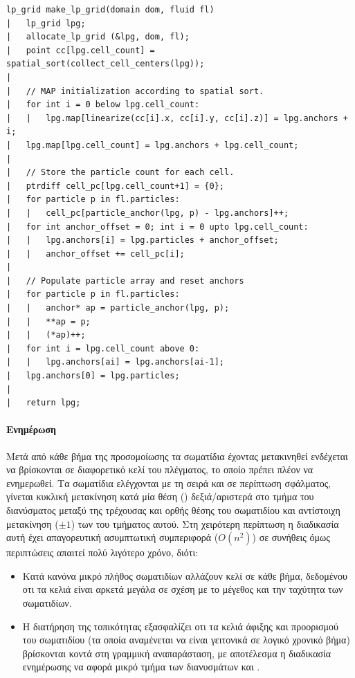 \begin{verbatim}
lp_grid make_lp_grid(domain dom, fluid fl)
|   lp_grid lpg;
|   allocate_lp_grid (&lpg, dom, fl);
|   point cc[lpg.cell_count] = spatial_sort(collect_cell_centers(lpg));
|
|   // MAP initialization according to spatial sort.
|   for int i = 0 below lpg.cell_count:
|   |   lpg.map[linearize(cc[i].x, cc[i].y, cc[i].z)] = lpg.anchors + i;
|   lpg.map[lpg.cell_count] = lpg.anchors + lpg.cell_count;
|
|   // Store the particle count for each cell.
|   ptrdiff cell_pc[lpg.cell_count+1] = {0};
|   for particle p in fl.particles:
|   |   cell_pc[particle_anchor(lpg, p) - lpg.anchors]++;
|   for int anchor_offset = 0; int i = 0 upto lpg.cell_count:
|   |   lpg.anchors[i] = lpg.particles + anchor_offset;
|   |   anchor_offset += cell_pc[i];
|
|   // Populate particle array and reset anchors
|   for particle p in fl.particles:
|   |   anchor* ap = particle_anchor(lpg, p);
|   |   **ap = p;
|   |   (*ap)++;
|   for int i = lpg.cell_count above 0:
|   |   lpg.anchors[ai] = lpg.anchors[ai-1];
|   lpg.anchors[0] = lpg.particles;
|
|   return lpg;
\end{verbatim}

\paragraph{Ενημέρωση} Μετά από κάθε βήμα της προσομοίωσης τα σωματίδια έχοντας μετακινηθεί
ενδέχεται να βρίσκονται σε διαφορετικό κελί του πλέγματος, το οποίο πρέπει πλέον να
ενημερωθεί. Τα σωματίδια ελέγχονται με τη σειρά και σε περίπτωση σφάλματος, γίνεται
κυκλική μετακίνηση κατά μία θέση () δεξιά/αριστερά στο τμήμα του διανύσματος
 μεταξύ της τρέχουσας και ορθής θέσης του σωματιδίου και αντίστοιχη
μετακίνηση ($\pm 1$)
των  του τμήματος αυτού. Στη χειρότερη περίπτωση η διαδικασία αυτή έχει
απαγορευτική ασυμπτωτική συμπεριφορά ($Ο(n^2)$)
σε συνήθεις όμως περιπτώσεις απαιτεί πολύ λιγότερο χρόνο, διότι:
\begin{itemize}
\item Κατά κανόνα μικρό πλήθος σωματιδίων αλλάζουν κελί σε κάθε βήμα, δεδομένου οτι τα
  κελιά είναι αρκετά μεγάλα σε σχέση με το μέγεθος και την ταχύτητα των σωματιδίων.
  
\item Η διατήρηση της τοπικότητας εξασφαλίζει οτι τα κελιά άφιξης και προορισμού του
  σωματιδίου (τα οποία αναμένεται να είναι γειτονικά σε λογικό χρονικό βήμα) βρίσκονται
  κοντά στη γραμμική αναπαράσταση, με αποτέλεσμα η διαδικασία ενημέρωσης να αφορά μικρό
  τμήμα των διανυσμάτων  και .
\end{itemize}

